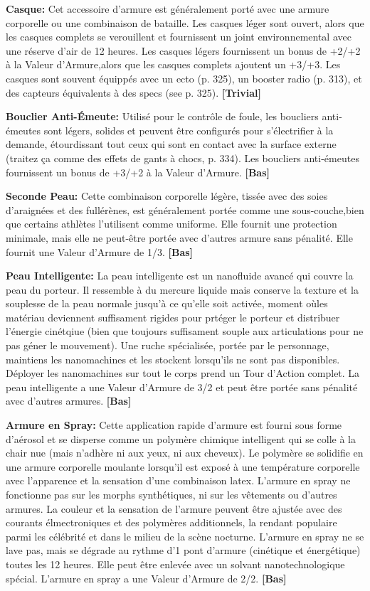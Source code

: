 \textbf{Casque:} Cet accessoire d'armure est généralement porté avec une armure corporelle ou une combinaison de bataille. Les casques léger sont ouvert, alors que les casques complets se verouillent et fournissent un joint environnemental avec une réserve d'air de 12 heures. Les casques légers fournissent un bonus de +2/+2 à la  Valeur d'Armure,alors que les casques complets ajoutent un +3/+3. Les casques sont souvent équippés avec un ecto (p. 325), un booster radio (p. 313), et des capteurs équivalents à des specs (see p. 325). \textbf{[Trivial]} 

\textbf{Bouclier Anti-Émeute:} Utilisé pour le contrôle de foule, les boucliers anti-émeutes sont légers, solides et peuvent être configurés pour s'électrifier à la demande, étourdissant tout ceux qui sont en contact avec la surface externe (traitez ça comme des effets de gants à chocs, p. 334). Les boucliers anti-émeutes fournissent un bonus de +3/+2 à la Valeur d'Armure. \textbf{[Bas]} 

\textbf{Seconde Peau:} Cette combinaison corporelle légère, tissée avec des soies d'araignées et des fullérènes, est généralement portée comme une sous-couche,bien que certains athlètes l'utilisent comme uniforme. Elle fournit une protection minimale, mais elle ne peut-être portée avec d'autres armure sans pénalité. Elle fournit une Valeur d'Armure de 1/3. \textbf{[Bas]} 

\textbf{Peau Intelligente:} La peau intelligente est un nanofluide avancé qui couvre la peau du porteur. Il ressemble à du mercure liquide mais conserve la texture et la souplesse de la peau normale jusqu'à ce qu'elle soit activée, moment oùles matériau deviennent suffisament rigides pour prtéger le porteur et distribuer l'énergie cinétqiue (bien que toujours suffisament souple aux articulations pour ne pas géner le mouvement). Une ruche spécialisée, portée par le personnage, maintiens les nanomachines et les stockent lorsqu'ils ne sont pas disponibles. Déployer les nanomachines sur tout le corps prend un Tour d'Action complet. La peau intelligente a une Valeur d'Armure de 3/2 et peut être portée sans pénalité avec d'autres armures. \textbf{[Bas]} 

\textbf{Armure en Spray:} Cette application rapide d'armure est fourni sous forme d'aérosol et se disperse comme un polymère chimique intelligent qui se colle à la chair nue (mais n'adhère ni aux yeux, ni aux cheveux). Le polymère se solidifie en une armure corporelle moulante lorsqu'il est exposé à une température corporelle avec l'apparence et la sensation d'une combinaison latex. L'armure en spray ne fonctionne pas sur les morphs synthétiques, ni sur les vêtements ou d'autres armures. La couleur et la sensation de l'armure peuvent être ajustée avec des courants élmectroniques et des polymères additionnels, la rendant populaire parmi les célébrité et dans le milieu de la scène nocturne. L'armure en spray ne se lave pas, mais se dégrade au rythme d'1 pont d'armure (cinétique et énergétique) toutes les 12 heures. Elle peut être enlevée avec un solvant nanotechnologique spécial. L'armure en spray a une Valeur d'Armure de 2/2. \textbf{[Bas]} 

